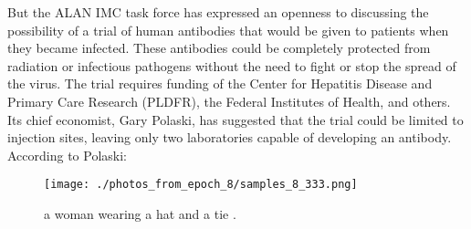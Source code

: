 \documentclass{article}%
\begin{document}
But the ALAN IMC task force has expressed an openness to discussing the possibility of a trial of human antibodies that would be given to patients when they became infected. These antibodies could be completely protected from radiation or infectious pathogens without the need to fight or stop the spread of the virus.\newline%
The trial requires funding of the Center for Hepatitis Disease and Primary Care Research (PLDFR), the Federal Institutes of Health, and others. Its chief economist, Gary Polaski, has suggested that the trial could be limited to injection sites, leaving only two laboratories capable of developing an antibody.\newline%
According to Polaski:\newline%

%


\begin{figure}[h!]%
\centering%
\texttt{[image: ./photos\_from\_epoch\_8/samples\_8\_333.png]}%
\caption{a woman wearing a hat and a tie .}%
\end{figure}

%
\end{document}
